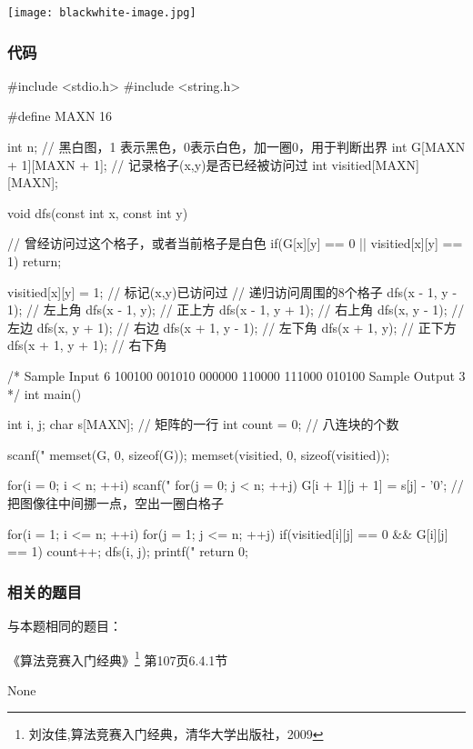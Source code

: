 \begin{center}
\texttt{[image: blackwhite-image.jpg]}\\
\label{fig:blackwhiteImage}
\end{center}

\subsubsection{代码}
\begin{Codex}[label=blackwhite_image.c]
#include <stdio.h>
#include <string.h>

#define MAXN 16

int n;
// 黑白图，1 表示黑色，0表示白色，加一圈0，用于判断出界
int G[MAXN + 1][MAXN + 1];
// 记录格子(x,y)是否已经被访问过
int visitied[MAXN][MAXN];

void dfs(const int x, const int y) {
    // 曾经访问过这个格子，或者当前格子是白色
    if(G[x][y] == 0 || visitied[x][y] == 1)  return;
    
    visitied[x][y] = 1; // 标记(x,y)已访问过
    // 递归访问周围的8个格子
    dfs(x - 1, y - 1); // 左上角
    dfs(x - 1, y); // 正上方
    dfs(x - 1, y + 1); // 右上角
    dfs(x, y - 1); // 左边
    dfs(x, y + 1); // 右边
    dfs(x + 1, y - 1); // 左下角
    dfs(x + 1, y); // 正下方
    dfs(x + 1, y + 1); // 右下角
}

/*
Sample Input
6
100100
001010
000000
110000
111000
010100
Sample Output
3
*/
int main() {
    int i, j;
    char s[MAXN]; // 矩阵的一行
    int count = 0; // 八连块的个数

    scanf("%
    memset(G, 0, sizeof(G));
    memset(visitied, 0, sizeof(visitied));

    for(i = 0; i < n; ++i) {
        scanf("%
        for(j = 0; j < n; ++j) {
            G[i + 1][j + 1] = s[j] - '0'; // 把图像往中间挪一点，空出一圈白格子
        }
    }


    for(i = 1; i <= n; ++i) {
        for(j = 1; j <= n; ++j) {
            if(visitied[i][j] == 0 && G[i][j] == 1) {
                count++;
                dfs(i, j);
            }
        }
    }
    printf("%
    return 0;
}
\end{Codex}

\subsubsection{相关的题目}
与本题相同的题目：
\begindot
\item 《算法竞赛入门经典》\footnote{刘汝佳,算法竞赛入门经典，清华大学出版社，2009} 第107页6.4.1节
\item  None
\myenddot

